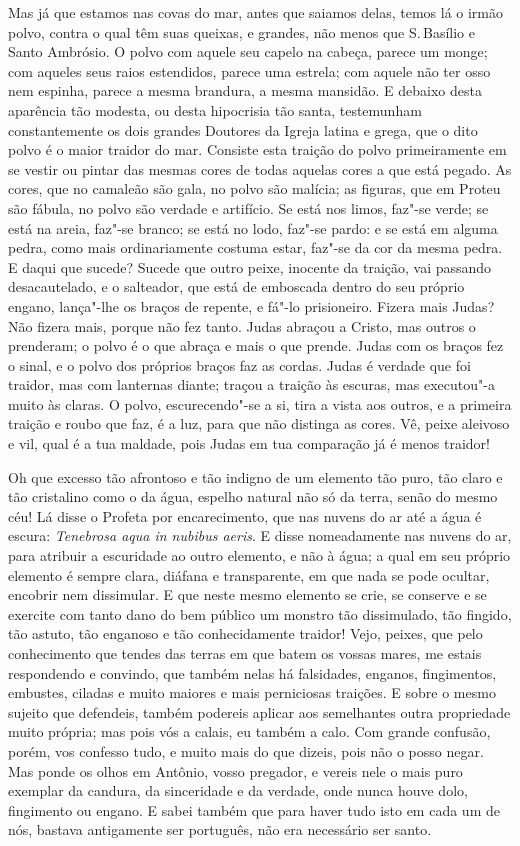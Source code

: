 Mas já que estamos nas covas do mar, antes que saiamos delas, temos lá o
irmão polvo, contra o qual têm suas queixas, e grandes, não menos que S.\,Basílio e Santo Ambrósio. O polvo com aquele seu capelo na cabeça,
parece um monge; com aqueles seus raios estendidos, parece uma estrela;
com aquele não ter osso nem espinha, parece a mesma brandura, a mesma
mansidão. E debaixo desta aparência tão modesta, ou desta hipocrisia tão
santa, testemunham constantemente os dois grandes Doutores da Igreja
latina e grega, que o dito polvo é o maior traidor do mar. Consiste esta
traição do polvo primeiramente em se vestir ou pintar das mesmas cores
de todas aquelas cores a que está pegado. As cores, que no camaleão são
gala, no polvo são malícia; as figuras, que em Proteu são fábula, no
polvo são verdade e artifício. Se está nos limos, faz"-se verde; se está
na areia, faz"-se branco; se está no lodo, faz"-se pardo: e se está em
alguma pedra, como mais ordinariamente costuma estar, faz"-se da cor da
mesma pedra. E daqui que sucede? Sucede que outro peixe, inocente da
traição, vai passando desacautelado, e o salteador, que está de
emboscada dentro do seu próprio engano, lança"-lhe os braços de repente,
e fá"-lo prisioneiro. Fizera mais Judas? Não fizera mais, porque não fez
tanto. Judas abraçou a Cristo, mas outros o prenderam; o polvo é o que
abraça e mais o que prende. Judas com os braços fez o sinal, e o polvo
dos próprios braços faz as cordas. Judas é verdade que foi traidor, mas
com lanternas diante; traçou a traição às escuras, mas executou"-a muito
às claras. O polvo, escurecendo"-se a si, tira a vista aos outros, e a
primeira traição e roubo que faz, é a luz, para que não distinga as
cores. Vê, peixe aleivoso e vil, qual é a tua maldade, pois Judas em tua
comparação já é menos traidor!

Oh que excesso tão afrontoso e tão indigno de um elemento tão puro, tão
claro e tão cristalino como o da água, espelho natural não só da terra,
senão do mesmo céu! Lá disse o Profeta por encarecimento, que nas
nuvens do ar até a água é escura: \emph{Tenebrosa aqua in nubibus
aeris}. E disse nomeadamente nas nuvens do ar, para atribuir a
escuridade ao outro elemento, e não à água; a qual em seu próprio
elemento é sempre clara, diáfana e transparente, em que nada se pode
ocultar, encobrir nem dissimular. E que neste mesmo elemento se crie, se
conserve e se exercite com tanto dano do bem público um monstro tão
dissimulado, tão fingido, tão astuto, tão enganoso e tão conhecidamente
traidor!
Vejo, peixes, que pelo conhecimento que tendes das terras em que batem
os vossas mares, me estais respondendo e convindo, que também nelas há
falsidades, enganos, fingimentos, embustes, ciladas e muito maiores e
mais perniciosas traições. E sobre o mesmo sujeito que defendeis, também
podereis aplicar aos semelhantes outra propriedade muito própria; mas
pois vós a calais, eu também a calo. Com grande confusão, porém, vos
confesso tudo, e muito mais do que dizeis, pois não o posso negar. Mas
ponde os olhos em Antônio, vosso pregador, e vereis nele o mais puro
exemplar da candura, da sinceridade e da verdade, onde nunca houve dolo,
fingimento ou engano. E sabei também que para haver tudo isto em cada um
de nós, bastava antigamente ser português, não era necessário ser santo.


